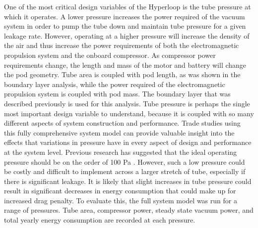 One of the most critical design variables of the Hyperloop is the tube pressure
at which it operates. A lower pressure increases the power required of the
vacuum system in order to pump the tube down and maintain tube pressure for a
given leakage rate. However, operating at a higher pressure
will increase the density of the air and thus increase the power
requirements of both the electromagnetic propulsion system and the onboard compressor.
As compressor power requirements change, the length and mass of the motor and
battery will change the pod geometry. Tube area is coupled with pod length,
as was shown in the boundary layer analysis, while the power required of the
electromagnetic propulsion system is coupled with pod mass. The boundary layer
that was described previously is used for this analysis. Tube pressure is
perhaps the single most important design variable to understand, because it is
coupled with so many different aspects of system construction and performance.
Trade studies using this fully comprehensive system model can provide valuable
insight into the effects that variations in pressure have in every aspect of
design and performance at the system level.
Previous research has suggested that the ideal operating pressure should be on
the order of 100 Pa \cite{Musk, Chin}. However, such a low pressure could be
costly and difficult to implement across a larger stretch of tube,
especially if there is significant leakage. It is likely that slight increases
in tube pressure could result in significant decreases in energy consumption
that could make up for increased drag penalty. To evaluate this, the full
system model was run for a range of pressures. Tube area, compressor power,
steady state vacuum power, and total yearly energy consumption are recorded at each pressure.

